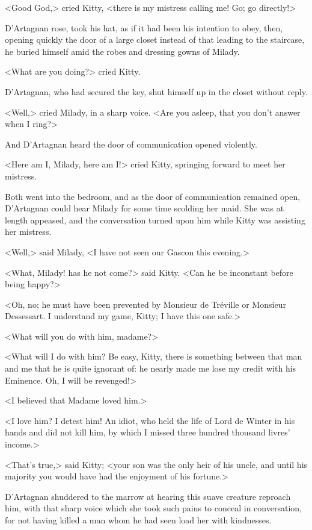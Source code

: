 <Good God,> cried Kitty, <there is my mistress calling me! Go; go directly!> 

D'Artagnan rose, took his hat, as if it had been his intention to obey, then, opening quickly the door of a large closet instead of that leading to the staircase, he buried himself amid the robes and dressing gowns of Milady. 

<What are you doing?> cried Kitty. 

D'Artagnan, who had secured the key, shut himself up in the closet without reply. 

<Well,> cried Milady, in a sharp voice. <Are you asleep, that you don't answer when I ring?> 

And D'Artagnan heard the door of communication opened violently. 

<Here am I, Milady, here am I!> cried Kitty, springing forward to meet her mistress. 

Both went into the bedroom, and as the door of communication remained open, D'Artagnan could hear Milady for some time scolding her maid. She was at length appeased, and the conversation turned upon him while Kitty was assisting her mistress. 

<Well,> said Milady, <I have not seen our Gascon this evening.> 

<What, Milady! has he not come?> said Kitty. <Can he be inconstant before being happy?> 

<Oh, no; he must have been prevented by Monsieur de Tréville or Monsieur Dessessart. I understand my game, Kitty; I have this one safe.> 

<What will you do with him, madame?> 

<What will I do with him? Be easy, Kitty, there is something between that man and me that he is quite ignorant of: he nearly made me lose my credit with his Eminence. Oh, I will be revenged!> 

<I believed that Madame loved him.> 

<I love him? I detest him! An idiot, who held the life of Lord de Winter in his hands and did not kill him, by which I missed three hundred thousand livres' income.> 

<That's true,> said Kitty; <your son was the only heir of his uncle, and until his majority you would have had the enjoyment of his fortune.> 

D'Artagnan shuddered to the marrow at hearing this suave creature reproach him, with that sharp voice which she took such pains to conceal in conversation, for not having killed a man whom he had seen load her with kindnesses. 

